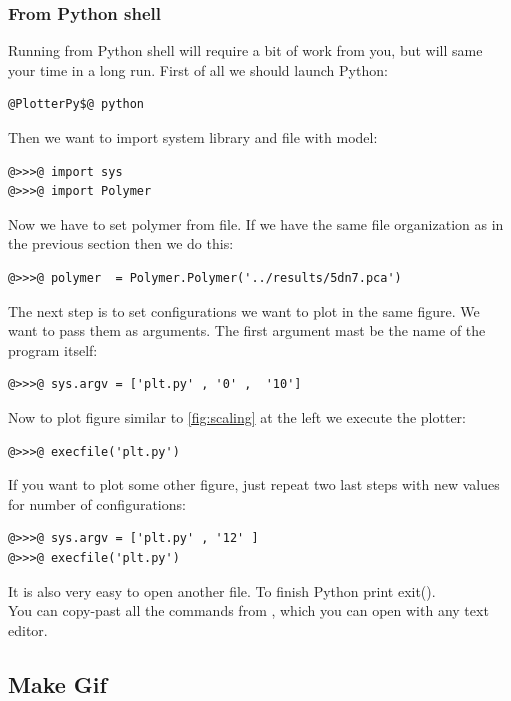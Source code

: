 \documentclass[12pt]{article}
\begin{document}
\begin{mySection}
\subsubsection{From Python shell}
Running from Python shell will require a bit of work from you, but will same your time in a long run.
First of all we should launch Python:
\begin{lstlisting}
@PlotterPy$@ python
\end{lstlisting}
Then we want to import system library and file with model:
\begin{lstlisting}
@>>>@ import sys
@>>>@ import Polymer
\end{lstlisting}
Now we have to set polymer from file. If we have the same file organization as in the previous section then we do this:
 \begin{lstlisting}
@>>>@ polymer  = Polymer.Polymer('../results/5dn7.pca')
\end{lstlisting}
The next step is to set configurations we want to plot in the same figure.  We want to pass them as arguments. The first argument mast be the name of the program itself:
\begin{lstlisting}
@>>>@ sys.argv = ['plt.py' , '0' ,  '10']
\end{lstlisting}
Now to plot figure similar to \ref{fig:scaling} at the left we execute the plotter:
\begin{lstlisting}
@>>>@ execfile('plt.py')
\end{lstlisting}
If you want to plot some other figure, just repeat two last steps with new values for number of configurations:
\begin{lstlisting}
@>>>@ sys.argv = ['plt.py' , '12' ]
@>>>@ execfile('plt.py')
\end{lstlisting}
It is also very easy to open another file. To finish Python print exit().\\
\hint You can copy-past all the commands from , which you can open with any text editor.
\subsection{Make Gif}

\end{mySection}

\begin{mySection}[GNUplot]\label{sec:gnuplot}


\end{mySection}
\end{document}
